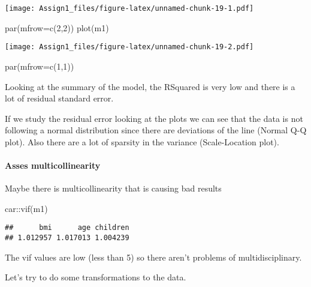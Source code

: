 \documentclass[
]{article}
\newenvironment{Shaded}{\begin{snugshade}}{\end{snugshade}}
\newcommand{\AttributeTok}[1]{\textcolor[rgb]{0.77,0.63,0.00}{#1}}
\newcommand{\DecValTok}[1]{\textcolor[rgb]{0.00,0.00,0.81}{#1}}
\newcommand{\FunctionTok}[1]{\textcolor[rgb]{0.00,0.00,0.00}{#1}}
\newcommand{\NormalTok}[1]{#1}
\newcommand{\SpecialCharTok}[1]{\textcolor[rgb]{0.00,0.00,0.00}{#1}}
\begin{document}
\texttt{[image: Assign1\_files/figure-latex/unnamed-chunk-19-1.pdf]}

\begin{Shaded}
\begin{Highlighting}[]
\FunctionTok{par}\NormalTok{(}\AttributeTok{mfrow=}\FunctionTok{c}\NormalTok{(}\DecValTok{2}\NormalTok{,}\DecValTok{2}\NormalTok{))}
\FunctionTok{plot}\NormalTok{(m1)}
\end{Highlighting}
\end{Shaded}

\texttt{[image: Assign1\_files/figure-latex/unnamed-chunk-19-2.pdf]}

\begin{Shaded}
\begin{Highlighting}[]
\FunctionTok{par}\NormalTok{(}\AttributeTok{mfrow=}\FunctionTok{c}\NormalTok{(}\DecValTok{1}\NormalTok{,}\DecValTok{1}\NormalTok{))}
\end{Highlighting}
\end{Shaded}

Looking at the summary of the model, the RSquared is very low and there
is a lot of residual standard error.

If we study the residual error looking at the plots we can see that the
data is not following a normal distribution since there are deviations
of the line (Normal Q-Q plot). Also there are a lot of sparsity in the
variance (Scale-Location plot).

\hypertarget{asses-multicollinearity}{%
\paragraph{Asses multicollinearity}\label{asses-multicollinearity}}

Maybe there is multicollinearity that is causing bad results

\begin{Shaded}
\begin{Highlighting}[]
\NormalTok{car}\SpecialCharTok{::}\FunctionTok{vif}\NormalTok{(m1)}
\end{Highlighting}
\end{Shaded}

\begin{verbatim}
##      bmi      age children 
## 1.012957 1.017013 1.004239
\end{verbatim}

The vif values are low (less than 5) so there aren't problems of
multidisciplinary.

Let's try to do some transformations to the data.
\end{document}
